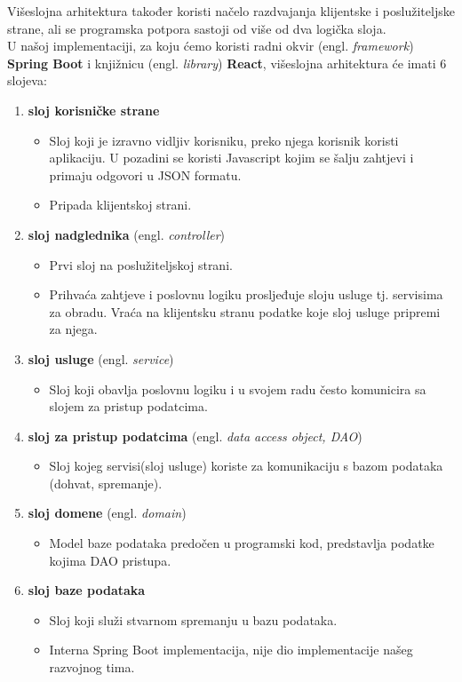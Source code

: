 	\noindent Višeslojna arhitektura također koristi načelo razdvajanja klijentske i poslužiteljske strane, ali se programska potpora sastoji od više od dva logička sloja. \\
	U našoj implementaciji, za koju ćemo koristi radni okvir (engl. \textit{framework}) \textbf{Spring Boot} i knjižnicu (engl. \textit{library}) \textbf{React}, višeslojna arhitektura će imati 6 slojeva: 
	\begin{enumerate}
		\item \textbf{sloj korisničke strane}  
		\begin{itemize}
			\item Sloj koji je izravno vidljiv korisniku, preko njega korisnik koristi aplikaciju. U pozadini se koristi Javascript kojim se šalju zahtjevi i primaju odgovori u JSON formatu.
			\item Pripada klijentskoj strani.
		\end{itemize}
		
		
		\item \textbf{sloj nadglednika} (engl. \textit{controller}) 
		\begin{itemize}
			\item Prvi sloj na poslužiteljskoj strani.
			\item Prihvaća zahtjeve i poslovnu logiku prosljeđuje sloju usluge tj. servisima za obradu. Vraća na klijentsku stranu podatke koje sloj usluge pripremi za njega.
		\end{itemize}
		
		\item \textbf{sloj usluge} (engl. \textit{service})
		\begin{itemize}
			\item Sloj koji obavlja poslovnu logiku i u svojem radu često komunicira sa slojem za pristup podatcima.
		\end{itemize}
		
		\item \textbf{sloj za pristup podatcima} (engl. \textit{data access object, DAO})
		\begin{itemize}
			\item Sloj kojeg servisi(sloj usluge) koriste za komunikaciju s bazom podataka (dohvat, spremanje).
		\end{itemize}
		
		\item \textbf{sloj domene} (engl. \textit{domain})
		\begin{itemize}
			\item Model baze podataka predočen u programski kod, predstavlja podatke kojima DAO pristupa.
		\end{itemize}
		
		\item \textbf{sloj baze podataka} 
		\begin{itemize}
			\item Sloj koji služi stvarnom spremanju u bazu podataka. 
			\item Interna Spring Boot implementacija, nije dio implementacije našeg razvojnog tima. 
		\end{itemize}
		
	\end{enumerate}

